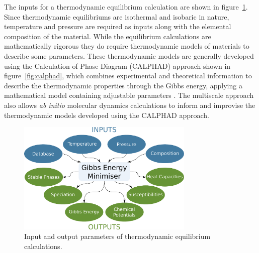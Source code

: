 	The inputs for a thermodynamic equilibrium calculation are shown in figure~\ref{fig:Thermod}. Since thermodynamic equilibriums are isothermal and isobaric in nature, temperature and pressure are required as inputs along with the elemental composition of the material. While the equilibrium calculations are mathematically rigorous they do require thermodynamic models of materials to describe some parameters.  These thermodynamic models are generally developed using the Calculation of Phase Diagram (CALPHAD) approach shown in figure~\ref{fig:calphad}, which combines experimental and theoretical information to describe the thermodynamic properties through the Gibbs energy, applying a mathematical model containing adjustable parameters \cite{Lukas07}.  The multiscale approach also allows \textit{ab initio} molecular dynamics calculations to inform and improvise the thermodynamic models developed using the CALPHAD approach.
	\begin{figure}
        		\centering
        		\includegraphics[width=0.75\textwidth]{figures/chapter-1/Thermodynamics.pdf}
        		\caption{Input and output parameters of thermodynamic equilibrium calculations.}
        		\label{fig:Thermod}
    	\end{figure}

